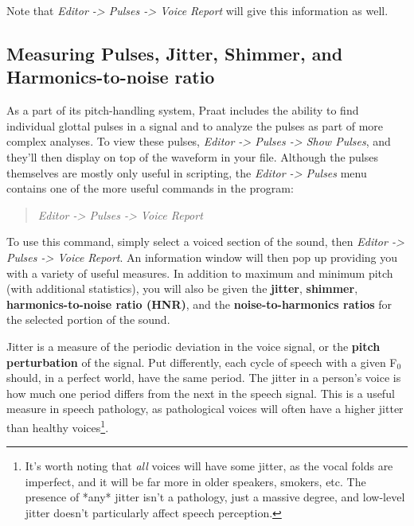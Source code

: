 \documentclass[11pt]{article}
\begin{document}
Note that \emph{Editor -\textgreater{} Pulses -\textgreater{} Voice
Report} will give this information as well.

\hypertarget{measuring-pulses-jitter-shimmer-and-harmonics-to-noise-ratio}{%
\subsection{Measuring Pulses, Jitter, Shimmer, and Harmonics-to-noise
ratio}\label{measuring-pulses-jitter-shimmer-and-harmonics-to-noise-ratio}}

\label{pulsesjittershimmerhnr}

As a part of its pitch-handling system, Praat includes the ability to
find individual glottal pulses in a signal and to analyze the pulses as
part of more complex analyses. To view these pulses, \emph{Editor
-\textgreater{} Pulses -\textgreater{} Show Pulses}, and they'll then
display on top of the waveform in your file. Although the pulses
themselves are mostly only useful in scripting, the \emph{Editor
-\textgreater{} Pulses} menu contains one of the more useful commands in
the program:

\begin{quote}
\emph{Editor -\textgreater{} Pulses -\textgreater{} Voice Report}
\end{quote}

To use this command, simply select a voiced section of the sound, then
\emph{Editor -\textgreater{} Pulses -\textgreater{} Voice Report}. An
information window will then pop up providing you with a variety of
useful measures. In addition to maximum and minimum pitch (with
additional statistics), you will also be given the \textbf{jitter},
\textbf{shimmer}, \textbf{harmonics-to-noise ratio (HNR)}, and the
\textbf{noise-to-harmonics ratios} for the selected portion of the
sound.

Jitter is a measure of the periodic deviation in the voice signal, or
the \textbf{pitch perturbation} of the signal. Put differently, each
cycle of speech with a given F$_{0}$ should, in a perfect world, have the
same period. The jitter in a person's voice is how much one period
differs from the next in the speech signal. This is a useful measure in
speech pathology, as pathological voices will often have a higher jitter
than healthy
voices\footnote{It’s worth noting that \textit{all} voices will have some jitter, as the vocal folds are imperfect, and it will be far more in older speakers, smokers, etc.  The presence of *any* jitter isn't a pathology, just a massive degree, and low-level jitter doesn't particularly affect speech perception.}.
\end{document}
